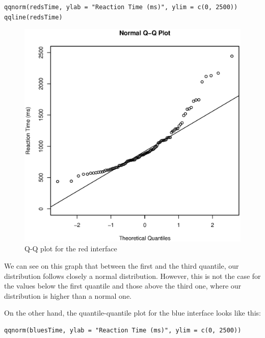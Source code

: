 \documentclass[12pt,a4paper]{scrartcl}
\begin{document}
\begin{lstlisting}[frame=single]
qqnorm(redsTime, ylab = "Reaction Time (ms)", ylim = c(0, 2500))
qqline(redsTime)
\end{lstlisting}
\begin{figure}[H]
\includegraphics[scale=0.7]{QQPlotRed.eps}
\centering
\caption{Q-Q plot for the red interface}
\end{figure}

We can see on this graph that between the first and the third quantile, our distribution follows closely a normal distribution. However, this is not the case for the values below the first quantile and those above the third one, where our distribution is higher than a normal one.

On the other hand, the quantile-quantile plot for the blue interface looks like this:
\begin{lstlisting}[frame=single]
qqnorm(bluesTime, ylab = "Reaction Time (ms)", ylim = c(0, 2500))
\end{lstlisting}
\end{document}
